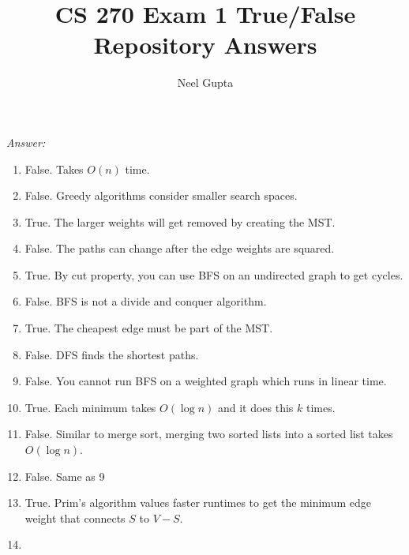 \documentclass[12pt]{article}
\begin{document}
\title{\vspace{-4cm}CS 270 Exam 1 True/False Repository Answers}
\author{Neel Gupta}
\maketitle

\textit{Answer:}
\begin{enumerate}
    \item False. Takes $O(n)$ time.
    \item False. Greedy algorithms consider smaller search spaces.
    \item True. The larger weights will get removed by creating the MST.
    \item False. The paths can change after the edge weights are squared.
    \item True. By cut property, you can use BFS on an undirected graph to get cycles.
    \item False. BFS is not a divide and conquer algorithm.
    \item True. The cheapest edge must be part of the MST.
    \item False. DFS finds the shortest paths.
    \item False. You cannot run BFS on a weighted graph which runs in linear time.
    \item True. Each minimum takes $O(\log n)$ and it does this $k$ times.
    \item False. Similar to merge sort, merging two sorted lists into a sorted list takes $O(\log n)$.
    \item False. Same as 9
    \item True. Prim's algorithm values faster runtimes to get the minimum edge weight that connects $S$ to $V-S$.
    \item 
\end{enumerate}
\end{document}
